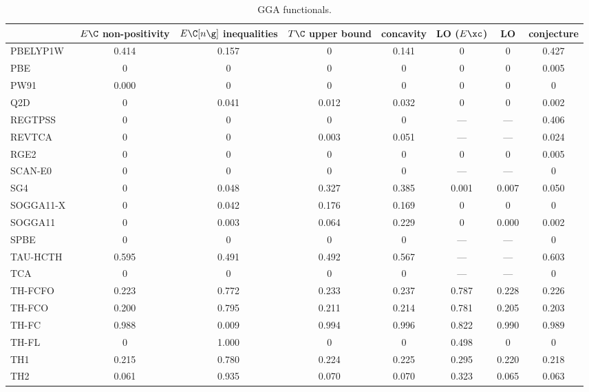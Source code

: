 \begin{table}
\caption{GGA functionals.}
\begin{tabular}{|l|c|c|c|c|c|c|c|}
\toprule
 & $E\C$ non-positivity & $E\C[n\g]$ inequalities & $T\C$ upper bound & concavity & LO ($E\xc$) & LO & conjecture \\
\midrule
PBELYP1W~\cite{Dahlke2005_15677} & 0.414 & 0.157 & 0 & 0.141 & 0 & 0 & 0.427 \\
PBE~\cite{Perdew1996_3865,Perdew1996_3865_err} & 0 & 0 & 0 & 0 & 0 & 0 & 0.005 \\
PW91~\cite{Perdew1991,Perdew1992_6671,Perdew1992_6671_err} & 0.000 & 0 & 0 & 0 & 0 & 0 & 0 \\
Q2D~\cite{Chiodo2012_126402} & 0 & 0.041 & 0.012 & 0.032 & 0 & 0 & 0.002 \\
REGTPSS~\cite{Perdew2009_026403} & 0 & 0 & 0 & 0 & --- & --- & 0.406 \\
REVTCA~\cite{Tognetti2008_536} & 0 & 0 & 0.003 & 0.051 & --- & --- & 0.024 \\
RGE2~\cite{Ruzsinszky2009_763} & 0 & 0 & 0 & 0 & 0 & 0 & 0.005 \\
SCAN-E0~\cite{Sun2015_036402} & 0 & 0 & 0 & 0 & --- & --- & 0 \\
SG4~\cite{Constantin2016_045126} & 0 & 0.048 & 0.327 & 0.385 & 0.001 & 0.007 & 0.050 \\
SOGGA11-X~\cite{Peverati2011_191102} & 0 & 0.042 & 0.176 & 0.169 & 0 & 0 & 0 \\
SOGGA11~\cite{Peverati2011_1991} & 0 & 0.003 & 0.064 & 0.229 & 0 & 0.000 & 0.002 \\
SPBE~\cite{Swart2009_094103} & 0 & 0 & 0 & 0 & --- & --- & 0 \\
TAU-HCTH~\cite{Boese2002_9559} & 0.595 & 0.491 & 0.492 & 0.567 & --- & --- & 0.603 \\
TCA~\cite{Tognetti2008_034101} & 0 & 0 & 0 & 0 & --- & --- & 0 \\
TH-FCFO~\cite{Tozer1997_183} & 0.223 & 0.772 & 0.233 & 0.237 & 0.787 & 0.228 & 0.226 \\
TH-FCO~\cite{Tozer1997_183} & 0.200 & 0.795 & 0.211 & 0.214 & 0.781 & 0.205 & 0.203 \\
TH-FC~\cite{Tozer1997_183} & 0.988 & 0.009 & 0.994 & 0.996 & 0.822 & 0.990 & 0.989 \\
TH-FL~\cite{Tozer1997_183} & 0 & 1.000 & 0 & 0 & 0.498 & 0 & 0 \\
TH1~\cite{Tozer1998_2545} & 0.215 & 0.780 & 0.224 & 0.225 & 0.295 & 0.220 & 0.218 \\
TH2~\cite{Tozer1998_3162} & 0.061 & 0.935 & 0.070 & 0.070 & 0.323 & 0.065 & 0.063 \\

\end{tabular}
\end{table}
